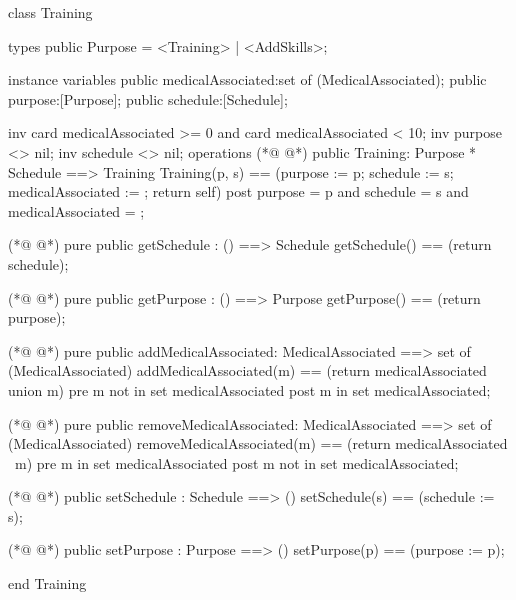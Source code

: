 \begin{vdmpp}[breaklines=true]
class Training

types 
 public Purpose = <Training> | <AddSkills>;
 
instance variables
  public medicalAssociated:set of (MedicalAssociated);
  public purpose:[Purpose];
  public schedule:[Schedule];
  
  inv card medicalAssociated >= 0 and card medicalAssociated < 10;
  inv purpose <> nil;
  inv schedule <> nil;
operations
(*@
\label{Training:15}
@*)
 public Training: Purpose * Schedule ==> Training
  Training(p, s) == (purpose := p; schedule := s; medicalAssociated := {}; return self)
 post purpose = p and schedule = s and medicalAssociated = {};
 
(*@
\label{getSchedule:19}
@*)
 pure public getSchedule : () ==> Schedule
  getSchedule() == (return schedule);
  
(*@
\label{getPurpose:22}
@*)
 pure public getPurpose : () ==> Purpose
  getPurpose() == (return purpose);
  
(*@
\label{addMedicalAssociated:25}
@*)
 pure public addMedicalAssociated: MedicalAssociated ==> set of (MedicalAssociated)
  addMedicalAssociated(m) == (return medicalAssociated union {m})
 pre m not in set medicalAssociated
 post m in set medicalAssociated;
  
(*@
\label{removeMedicalAssociated:30}
@*)
 pure public removeMedicalAssociated: MedicalAssociated ==> set of (MedicalAssociated)
  removeMedicalAssociated(m) == (return medicalAssociated \ {m})
 pre m in set medicalAssociated
 post m not in set medicalAssociated;
  
(*@
\label{setSchedule:35}
@*)
 public setSchedule : Schedule ==> ()
  setSchedule(s) == (schedule := s);
 
(*@
\label{setPurpose:38}
@*)
 public setPurpose : Purpose ==> ()
  setPurpose(p) == (purpose := p);

end Training
\end{vdmpp}
